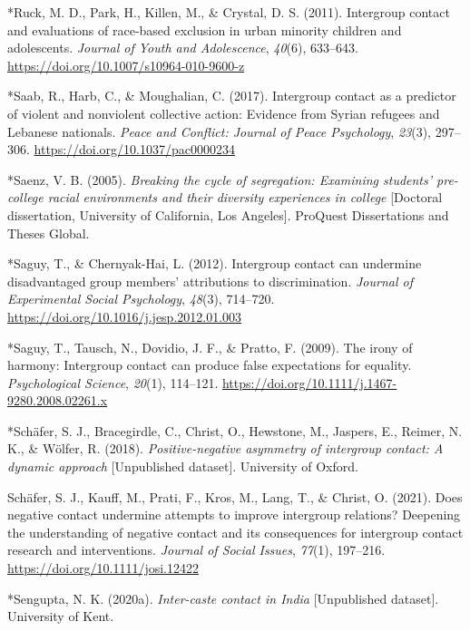 \documentclass[12pt, letterpaper]{article}
\newenvironment{CSLReferences}[2]{}{}
\begin{document}
\begin{CSLReferences}{1}{0}
\leavevmode\hypertarget{ref-244}{}%
*Ruck, M. D., Park, H., Killen, M., \& Crystal, D. S. (2011). Intergroup
contact and evaluations of race-based exclusion in urban minority
children and adolescents. \emph{Journal of Youth and Adolescence},
\emph{40}(6), 633--643. \url{https://doi.org/10.1007/s10964-010-9600-z}

\leavevmode\hypertarget{ref-1114}{}%
*Saab, R., Harb, C., \& Moughalian, C. (2017). Intergroup contact as a
predictor of violent and nonviolent collective action: {Evidence} from
{Syrian} refugees and {Lebanese} nationals. \emph{Peace and Conflict:
Journal of Peace Psychology}, \emph{23}(3), 297--306.
\url{https://doi.org/10.1037/pac0000234}

\leavevmode\hypertarget{ref-2333}{}%
*Saenz, V. B. (2005). \emph{Breaking the cycle of segregation: Examining
students' pre-college racial environments and their diversity
experiences in college} {[}Doctoral dissertation, University of
California, Los Angeles{]}. {ProQuest Dissertations and Theses Global}.

\leavevmode\hypertarget{ref-4005}{}%
*Saguy, T., \& Chernyak-Hai, L. (2012). Intergroup contact can undermine
disadvantaged group members' attributions to discrimination.
\emph{Journal of Experimental Social Psychology}, \emph{48}(3),
714--720. \url{https://doi.org/10.1016/j.jesp.2012.01.003}

\leavevmode\hypertarget{ref-813}{}%
*Saguy, T., Tausch, N., Dovidio, J. F., \& Pratto, F. (2009). The irony
of harmony: Intergroup contact can produce false expectations for
equality. \emph{Psychological Science}, \emph{20}(1), 114--121.
\url{https://doi.org/10.1111/j.1467-9280.2008.02261.x}

\leavevmode\hypertarget{ref-2382}{}%
*Schäfer, S. J., Bracegirdle, C., Christ, O., Hewstone, M., Jaspers, E.,
Reimer, N. K., \& Wölfer, R. (2018). \emph{Positive-negative asymmetry
of intergroup contact: A dynamic approach} {[}Unpublished dataset{]}.
University of Oxford.

\leavevmode\hypertarget{ref-schafer_does_2021}{}%
Schäfer, S. J., Kauff, M., Prati, F., Kros, M., Lang, T., \& Christ, O.
(2021). Does negative contact undermine attempts to improve intergroup
relations? {Deepening} the understanding of negative contact and its
consequences for intergroup contact research and interventions.
\emph{Journal of Social Issues}, \emph{77}(1), 197--216.
\url{https://doi.org/10.1111/josi.12422}

\leavevmode\hypertarget{ref-2392}{}%
*Sengupta, N. K. (2020a). \emph{Inter-caste contact in {India}}
{[}Unpublished dataset{]}. University of Kent.


\end{CSLReferences}
\end{document}
